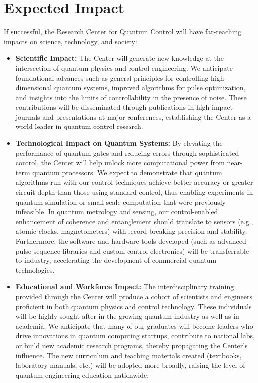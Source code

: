 \documentclass[11pt]{article}
\begin{document}
\section{Expected Impact}
If successful, the Research Center for Quantum Control will have far-reaching impacts on science, technology, and society:
\begin{itemize}
   \item \textbf{Scientific Impact:} The Center will generate new knowledge at the intersection of quantum physics and control engineering. We anticipate foundational advances such as general principles for controlling high-dimensional quantum systems, improved algorithms for pulse optimization, and insights into the limits of controllability in the presence of noise. These contributions will be disseminated through publications in high-impact journals and presentations at major conferences, establishing the Center as a world leader in quantum control research.
   \item \textbf{Technological Impact on Quantum Systems:} By elevating the performance of quantum gates and reducing errors through sophisticated control, the Center will help unlock more computational power from near-term quantum processors. We expect to demonstrate that quantum algorithms run with our control techniques achieve better accuracy or greater circuit depth than those using standard control, thus enabling experiments in quantum simulation or small-scale computation that were previously infeasible. In quantum metrology and sensing, our control-enabled enhancement of coherence and entanglement should translate to sensors (e.g., atomic clocks, magnetometers) with record-breaking precision and stability. Furthermore, the software and hardware tools developed (such as advanced pulse sequence libraries and custom control electronics) will be transferrable to industry, accelerating the development of commercial quantum technologies.
   \item \textbf{Educational and Workforce Impact:} The interdisciplinary training provided through the Center will produce a cohort of scientists and engineers proficient in both quantum physics and control technology. These individuals will be highly sought after in the growing quantum industry as well as in academia. We anticipate that many of our graduates will become leaders who drive innovations in quantum computing startups, contribute to national labs, or build new academic research programs, thereby propagating the Center’s influence. The new curriculum and teaching materials created (textbooks, laboratory manuals, etc.) will be adopted more broadly, raising the level of quantum engineering education nationwide.

\end{itemize}
\end{document}
